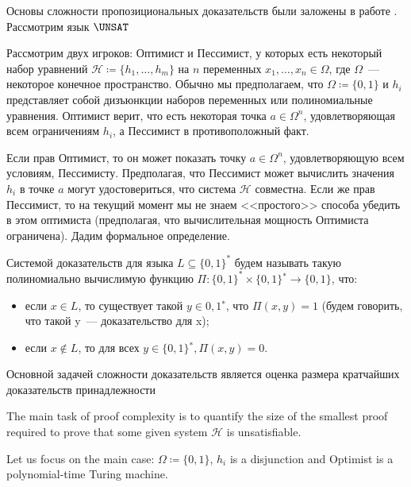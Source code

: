 Основы сложности пропозициональных доказательств были заложены в работе \cite{!!!}. Рассмотрим язык $\UNSAT$

Рассмотрим двух игроков: Оптимист и Пессимист, у которых есть некоторый набор уравнений $\mathcal{H}
\coloneqq \{h_1, \dots, h_m\}$ на $n$ переменных $x_1, \dots, x_n \in \Omega$, где $\Omega$~--- некоторое
конечное пространство. Обычно мы предполагаем, что $\Omega \coloneqq \{0, 1\}$ и $h_i$ представляет собой
дизъюнкции наборов переменных или полиномиальные уравнения. Оптимист верит, что есть некоторая точка $a
\in \Omega^n$, удовлетворяющая всем ограничениям $h_i$, а Пессимист в противоположный факт.

Если прав Оптимист, то он может показать точку $a \in \Omega^n$, удовлетворяющую всем условиям,
Пессимисту. Предполагая, что Пессимист может вычислить значения $h_i$ в точке $a$ могут удостовериться,
что система $\mathcal{H}$ совместна. Если же прав Пессимист, то на текущий момент мы не знаем
<<простого>> способа убедить в этом оптимиста (предполагая, что вычислительная мощность Оптимиста
ограничена). Дадим формальное определение.

Системой доказательств для языка $L \subseteq \{0, 1\}^*$ будем называть такую полиномиально вычислимую
функцию $\Pi\colon \{0, 1\}^* \times \{0, 1\}^∗ \to \{0, 1\}$, что:
\begin{itemize}
    \item если $x \in L$, то существует такой $y \in {0, 1}^∗$, что $\Pi(x, y) = 1$ (будем говорить, что
        такой y~--- доказательство для x);
    \item если $x \notin L$, то для всех $y \in \{0, 1\}^∗, \Pi(x, y) = 0$.        
\end{itemize}

Основной задачей сложности доказательств является оценка размера кратчайших доказательств принадлежности 

The main task of proof complexity is to quantify the size of the smallest proof required to
prove that some given system $\mathcal{H}$ is unsatisfiable.

Let us focus on the main case: $\Omega \coloneqq \{0, 1\}$, $h_i$ is a disjunction and Optimist is a
polynomial-time Turing machine.


